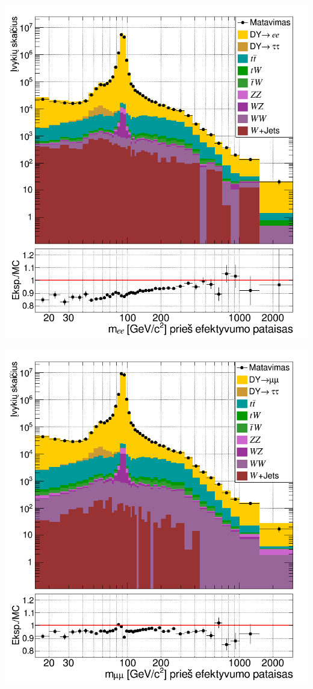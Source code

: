 \documentclass[a4paper, 12pt]{article}
\begin{document}
\vspace{0.5cm}
\begin{minipage}[t]{0.48\textwidth}
	\includegraphics[width=\linewidth]{ee_mass_beforeSF.png}
\end{minipage}
\hfill
\begin{minipage}[t]{0.48\textwidth}
	\includegraphics[width=\linewidth]{mumu_mass_beforeSF.png}
\end{minipage}
\end{document}
